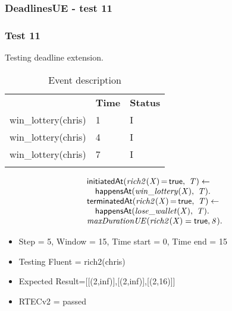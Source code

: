 \documentclass[8pt]{beamer}
\DeclareMathOperator{\val}{=}  %
\def \patsize {}
\def\happensAt{\textsf{\patsize happensAt}}
\def\initiatedAt{\textsf{\patsize initiatedAt}}
\def\terminatedAt{\textsf{\patsize terminatedAt}}
\def\true{\textsf{\patsize true}}
\newenvironment{mysplit}%
  {\arraycolsep 0pt \begin{array}{l}}%
  {\end{array}}
\begin{document}
\begin{frame}
    \frametitle{DeadlinesUE - test 11}
    \subsubsection{Test 11}
    \small
    Testing deadline extension.\linebreak
    \begin{minipage}{0.48\linewidth}
        \begin{table}[t!]
            \caption{Event description}
            \begin{center}

                \begin{tabular}{lll}
                    \hline\noalign{\smallskip}
                    \multicolumn{1}{l}{\textbf{Event}} & \multicolumn{1}{c}{\textbf{Time}} & \multicolumn{1}{c}{\textbf{Status}} \\
                    win\_lottery(chris)& 1 & I\\
                    win\_lottery(chris)& 4 & I\\
                    win\_lottery(chris)& 7 & I\\
                    \noalign{\smallskip}
                    \hline
                \end{tabular}
            \end{center}
        \end{table}
    \end{minipage}
    \begin{minipage}{0.48\linewidth}
        \begin{align*}
            \begin{mysplit}
                \initiatedAt\mathit{(rich2(X)\val\true,\ T) \leftarrow}\\
                \quad    \happensAt\mathit{(win\_lottery(X),\ T)}.\\
                \terminatedAt\mathit{(rich2(X)\val\true,\ T) \leftarrow}\\
                \quad    \happensAt\mathit{(lose\_wallet(X),\ T)}.\\
                \mathit{maxDurationUE(rich2(X)=\true,8)}.\\
            \end{mysplit}
        \end{align*}
    \end{minipage}
    \begin{itemize}
        \item Step = 5, Window = 15, Time start = 0, Time end = 15
        \item Testing Fluent = rich2(chris)
        \item Expected Result=[[(2,inf)],[(2,inf)],[(2,16)]]
        \item RTECv2 = passed
    \end{itemize}
\end{frame}
\end{document}
